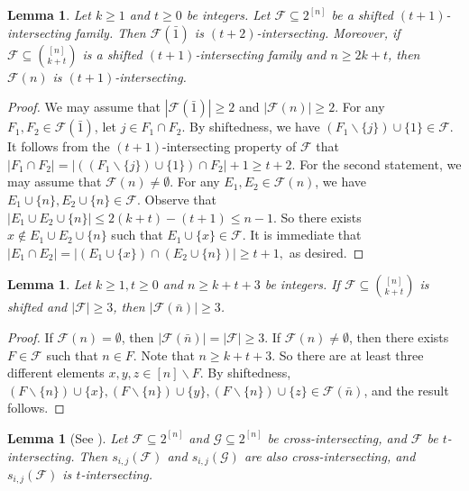 \documentclass[11pt]{article}
\numberwithin{equation}{section}
\newtheorem{lemma}[theorem]{Lemma}
\begin{document}
\begin{lemma}\label{S1}
Let $k\geq 1 $ and $ t\geq 0$ be integers. Let  $\mathcal{F} \subseteq 2^{[n]}$ be a shifted $(t+1)$-intersecting family. Then $\mathcal{F}(\bar{1})$ is $(t+2)$-intersecting. Moreover,  if $\mathcal{F} \subseteq\binom{[n]}{k+t}$ is a shifted $(t+1)$-intersecting family and $n\geq 2k+t$, then $\mathcal{F}(n)$ is $(t+1)$-intersecting.
\end{lemma}
\begin{proof}
 We may assume that $|\mathcal{F}(\bar{1})|\geq 2$ and  
$|\mathcal{F}(n)|\geq 2$.
 For any $F_1, F_2 \in \mathcal{F}(\bar{1})$, let $j\in F_1 \cap F_2$.
By shiftedness, we have $(F_1\backslash \{j\})\cup\{1\} \in \mathcal{F}$. It follows from the $(t+1)$-intersecting property of $\mathcal{F}$ that $| F_1 \cap F_2|=|\left((F_1\backslash \{j\})\cup\{1\} \right) \cap F_2|+1\geq t+2$.  For the second statement, we may assume that $\mathcal{F}(n)\neq\emptyset$. For any $E_1, E_2 \in \mathcal{F}(n)$, we have $E_1\cup\{n\}, E_2\cup\{n\}\in \mathcal{F}$. Observe that
$
|E_1\cup E_2\cup\{n\}|\leq 2(k+t)-(t+1)\leq n-1.
$
So there exists $x\notin E_1\cup E_2\cup\{n\}$ such that $E_1\cup\{x\} \in \mathcal{F}$. It is immediate that
$
|E_1\cap E_2|=|(E_1\cup\{x\})\cap (E_2\cup\{n\})|\geq t+1,
$
as desired.
\end{proof}

\begin{lemma}\label{S2}
Let $k\ge 1, t\ge 0 $ and $n\geq k+t+3$ be integers.
If  $\mathcal{F} \subseteq\binom{[n]}{k+t}$ is shifted and $|\mathcal{F}|\geq 3$, then $|\mathcal{F}(\bar{n})|\geq 3$.
\end{lemma}
\begin{proof}
If $\mathcal{F}(n)=\emptyset$, then $|\mathcal{F}(\bar{n})|=|\mathcal{F}|\geq 3$. If $\mathcal{F}(n)\neq\emptyset$, then there exists $F\in \mathcal{F}$ such that $n\in F$. Note that $n\geq k+t+3$. So there are at least three different elements $x, y, z\in [n]\backslash F $. By shiftedness, $(F\backslash\{n\})\cup\{x\}, (F\backslash\{n\})\cup\{y\}, (F\backslash\{n\})\cup\{z\}\in \mathcal{F}(\bar{n})$, and the result follows.
\end{proof}




\begin{lemma}[See \cite{E61}]  \label{S3}
 Let $\mathcal{F} \subseteq 2^{[n]}$ and $\mathcal{G} \subseteq 2^{[n]}$ be  cross-intersecting, and $\mathcal{F}$ be $t$-intersecting.
Then $s_{i, j}(\mathcal{F})$ and $s_{i, j}(\mathcal{G})$ are also cross-intersecting, and $s_{i, j}(\mathcal{F})$ is $t$-intersecting.
\end{lemma}
\end{document}
